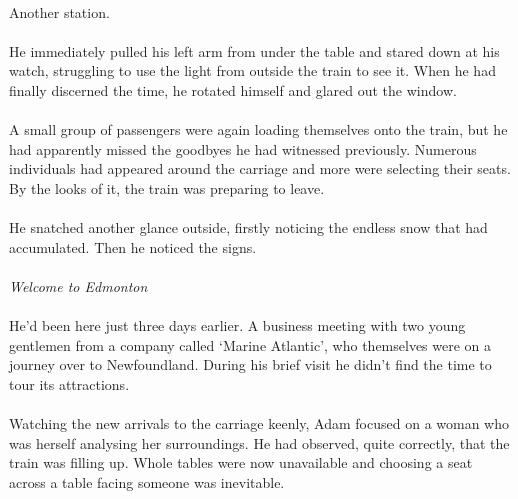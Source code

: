 \documentclass{article}
\begin{document}
\paragraph{}
Another station.

\paragraph{}
He immediately pulled his left arm from under the table and stared down at his watch, struggling to use the light from outside the train to see it. When he had finally discerned the time, he rotated himself and glared out the window.

\paragraph{}
A small group of passengers were again loading themselves onto the train, but he had apparently missed the goodbyes he had witnessed previously. Numerous individuals had appeared around the carriage and more were selecting their seats. By the looks of it, the train was preparing to leave.

\paragraph{}
He snatched another glance outside, firstly noticing the endless snow that had accumulated. Then he noticed the signs.

\paragraph{}
\emph{Welcome to Edmonton}

\paragraph{}
He'd been here just three days earlier. A business meeting with two young gentlemen from a company called `Marine Atlantic', who themselves were on a journey over to Newfoundland. During his brief visit he didn't find the time to tour its attractions.

\paragraph{}
Watching the new arrivals to the carriage keenly, Adam focused on a woman who was herself analysing her surroundings. He had observed, quite correctly, that the train was filling up. Whole tables were now unavailable and choosing a seat across a table facing someone was inevitable.
\end{document}
